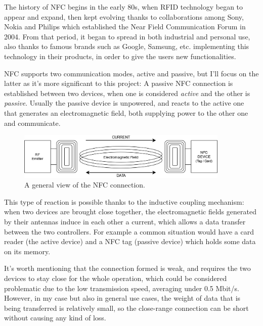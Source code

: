 \documentclass[target=bach,aauheader=,style=]{thud}
\begin{document}
The history of NFC begins in the early 80s, when RFID technology began to appear and expand, then kept evolving thanks to collaborations among Sony, Nokia and Philips which established the Near Field Communication Forum in 2004. From that period, it began to spread in both industrial and personal use, also thanks to famous brands such as Google, Samsung, etc. implementing this technology in their products, in order to give the users new functionalities.\par


NFC supports two communication modes, active and passive, but I'll focus on the latter as it's more significant to this project:
A passive NFC connection is established between two devices, when one is considered \emph{active} and the other is \emph{passive}. Usually the passive device is unpowered, and reacts to the active one that generates an electromagnetic field, both supplying power to the other one and communicate.

\begin{figure}[h!]
	\centering
	\includegraphics[width=0.9\textwidth]{bignfc}
	\caption{A general view of the NFC connection.}
	\label{fig:nfc_conn}
\end{figure} 

This type of reaction is possible thanks to the inductive coupling mechanism: when two devices are brought close together, the electromagnetic fields generated by their antennas induce in each other a current, which allows a data transfer between the two controllers. For example a common situation would have a card reader (the active device) and a NFC tag (passive device) which holds some data on its memory.\par

It's worth mentioning that the connection formed is weak, and requires the two devices to stay close for the whole operation, which could be considered problematic due to the low transmission speed, averaging under 0.5 Mbit/s. However, in my case but also in general use cases, the weight of data that is being transferred is relatively small, so the close-range connection can be short without causing any kind of loss.\par
\end{document}
